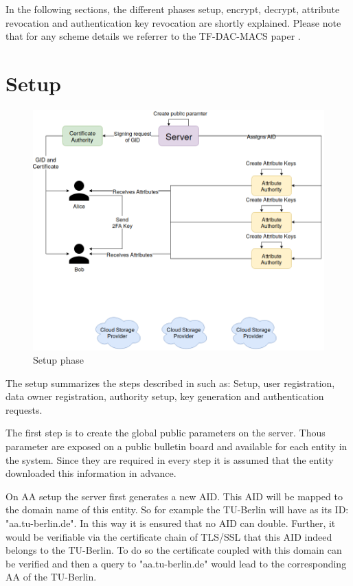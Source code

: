 In the following sections, the different phases setup, encrypt, decrypt, attribute revocation and authentication key revocation are shortly explained. Please note that for any scheme details we referrer to the TF-DAC-MACS \cite{li2017two} paper .

\section{Setup}
\begin{figure}[!ht]
\centering
    \includegraphics[width=\linewidth]{img/TF-DAC-MACS-overview-setup.png}
    \caption{Setup phase}
    \label{fig:tfdacmacs-setup}
\end{figure}

The setup summarizes the steps described in \cite{li2017two} such as: Setup, user registration, data owner registration, authority setup, key generation and authentication requests. 

The first step is to create the global public parameters on the server. Thous parameter are exposed on a public bulletin board and available for each entity in the system. Since they are required in every step it is assumed that the entity downloaded this information in advance. 

On AA setup the server first generates a new AID. This AID will be mapped to the domain name of this entity. So for example the TU-Berlin will have as its ID: "aa.tu-berlin.de". In this way it is ensured that no AID can double. Further, it would be verifiable via the certificate chain of TLS/SSL that this AID indeed belongs to the TU-Berlin. To do so the certificate coupled with this domain can be verified and then a query to "aa.tu-berlin.de" would lead to the corresponding AA of the TU-Berlin.

